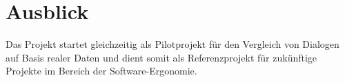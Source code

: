 \section{Ausblick}
Das Projekt startet gleichzeitig als Pilotprojekt für den Vergleich von Dialogen auf Basis realer Daten und dient somit als Referenzprojekt für zukünftige Projekte im Bereich der Software-Ergonomie.



